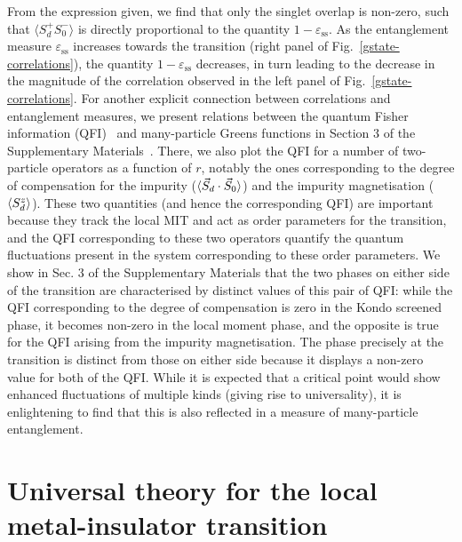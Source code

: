 \documentclass{iopart}
\begin{document}
From the expression given, we find that only the singlet overlap is non-zero, such that $\langle S_{d}^{+}S_{0}^{-}\rangle$ is directly proportional to the quantity \(1-\varepsilon_\text{ss}\). As the entanglement measure \(\varepsilon_\text{ss}\) increases towards the transition (right panel of Fig.~\eqref{gstate-correlations}), the quantity \(1 - \varepsilon_\text{ss}\) decreases, in turn leading to the decrease in the magnitude of the correlation observed in the left panel of Fig.~\eqref{gstate-correlations}. For another explicit connection between correlations and entanglement measures, we present relations between the quantum Fisher information (QFI)~\cite{Hauke2016} and many-particle Greens functions in Section 3 of the Supplementary Materials~\cite{supp_mat}. There, we also plot the QFI for a number of two-particle operators as a function of \(r\), notably the ones corresponding to the degree of compensation for the impurity (\(\braket{\vec{S}_d\cdot\vec{S}_0}\)) and the impurity magnetisation (\(\braket{S_d^z}\)).
These two quantities (and hence the corresponding QFI) are important because they track the local MIT and act as order parameters for the transition, and the QFI corresponding to these two operators quantify the quantum fluctuations present in the system corresponding to these order parameters.
We show in Sec. 3 of the Supplementary Materials that the two phases on either side of the transition are characterised by distinct values of this pair of QFI: while the QFI corresponding to the degree of compensation is zero in the Kondo screened phase, it becomes non-zero in the local moment phase, and the opposite is true for the QFI arising from the impurity magnetisation.
The phase precisely at the transition is distinct from those on either side because it displays a non-zero value for both of the QFI.
While it is expected that a critical point would show enhanced fluctuations of multiple kinds (giving rise to universality), it is enlightening to find that this is also reflected in a measure of many-particle entanglement.

\section{Universal theory for the local metal-insulator transition}\label{insights}
\end{document}

